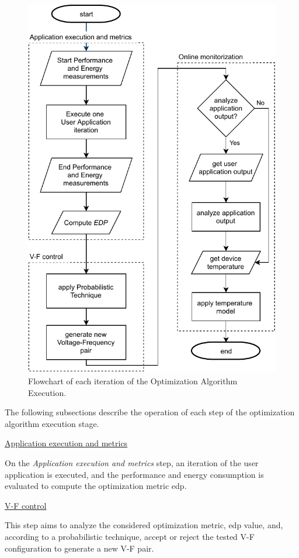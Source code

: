 \begin{figure}[h]
  \centering
  \includegraphics[height=\textwidth]{Figures/Optimization/flowchart.pdf}
  \caption{Flowchart of each iteration of the Optimization Algorithm Execution.}
  \label{fig:flowchart}
\end{figure}

The following subsections describe the operation of each step of the optimization algorithm execution stage.

\bigskip
\noindent\underline{Application execution and metrics}
\bigskip

On the \textit{Application execution and metrics} step, an iteration of the user application is executed, and the performance and energy consumption is evaluated to compute the optimization metric \acrshort{edp}. 

\bigskip
\noindent\underline{V-F control}
\bigskip


This step aims to analyze the considered optimization metric, \acrshort{edp} value, and, according to a probabilistic technique, accept or reject the tested V-F configuration to generate a new V-F pair.

